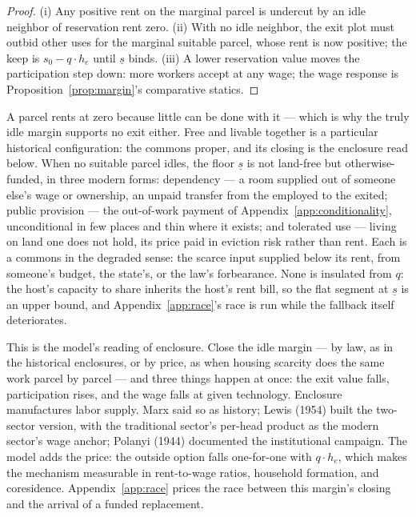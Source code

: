 \documentclass[12pt]{article}
\theoremstyle{plain}
\begin{document}
\begin{proof}
(i) Any positive rent on the marginal parcel is undercut by an idle neighbor of reservation rent zero. (ii) With no idle neighbor, the exit plot must outbid other uses for the marginal suitable parcel, whose rent is now positive; the keep is $s_0 - q\cdot h_e$ until $\underline{s}$ binds. (iii) A lower reservation value moves the participation step down: more workers accept at any wage; the wage response is Proposition~\ref{prop:margin}'s comparative statics.
\end{proof}

A parcel rents at zero because little can be done with it --- which is why the truly idle margin supports no exit either. Free and livable together is a particular historical configuration: the commons proper, and its closing is the enclosure read below. When no suitable parcel idles, the floor $\underline{s}$ is not land-free but otherwise-funded, in three modern forms: dependency --- a room supplied out of someone else's wage or ownership, an unpaid transfer from the employed to the exited; public provision --- the out-of-work payment of Appendix~\ref{app:conditionality}, unconditional in few places and thin where it exists; and tolerated use --- living on land one does not hold, its price paid in eviction risk rather than rent. Each is a commons in the degraded sense: the scarce input supplied below its rent, from someone's budget, the state's, or the law's forbearance. None is insulated from $q$: the host's capacity to share inherits the host's rent bill, so the flat segment at $\underline{s}$ is an upper bound, and Appendix~\ref{app:race}'s race is run while the fallback itself deteriorates.

This is the model's reading of enclosure. Close the idle margin --- by law, as in the historical enclosures, or by price, as when housing scarcity does the same work parcel by parcel --- and three things happen at once: the exit value falls, participation rises, and the wage falls at given technology. Enclosure manufactures labor supply. Marx said so as history; Lewis (1954) built the two-sector version, with the traditional sector's per-head product as the modern sector's wage anchor; Polanyi (1944) documented the institutional campaign. The model adds the price: the outside option falls one-for-one with $q\cdot h_e$, which makes the mechanism measurable in rent-to-wage ratios, household formation, and coresidence. Appendix~\ref{app:race} prices the race between this margin's closing and the arrival of a funded replacement.
\end{document}
